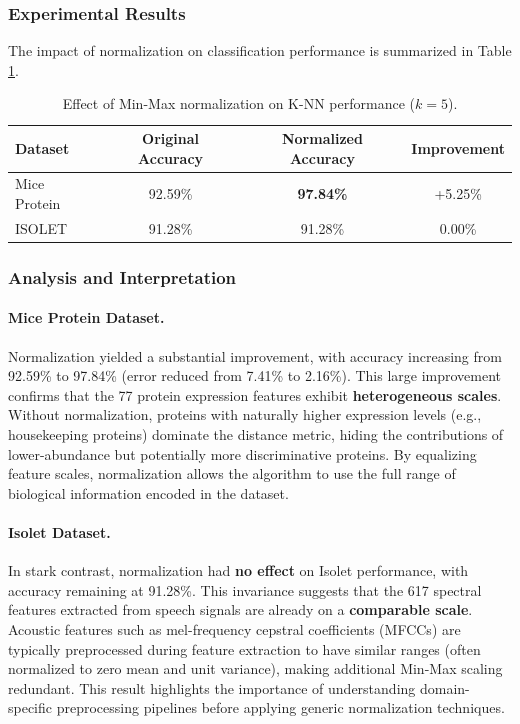 \documentclass[12pt]{article}
\begin{document}
\subsubsection{Experimental Results}
The impact of normalization on classification performance is summarized in Table \ref{tab:norm}.

\begin{table}[H]
\centering
\begin{tabular}{lccc}
\toprule
\textbf{Dataset} & \textbf{Original Accuracy} & \textbf{Normalized Accuracy} & \textbf{Improvement} \\
\midrule
Mice Protein & 92.59\% & \textbf{97.84\%} & +5.25\% \\
ISOLET & 91.28\% & 91.28\% & 0.00\% \\
\bottomrule
\end{tabular}
\caption{Effect of Min-Max normalization on K-NN performance ($k=5$).}
\label{tab:norm}
\end{table}

\subsubsection{Analysis and Interpretation}

\paragraph{Mice Protein Dataset.} Normalization yielded a substantial improvement, with accuracy increasing from 92.59\% to 97.84\% (error reduced from 7.41\% to 2.16\%). This large improvement confirms that the 77 protein expression features exhibit \textbf{heterogeneous scales}. Without normalization, proteins with naturally higher expression levels (e.g., housekeeping proteins) dominate the distance metric, hiding the contributions of lower-abundance but potentially more discriminative proteins. By equalizing feature scales, normalization allows the algorithm to use the full range of biological information encoded in the dataset.

\paragraph{Isolet Dataset.} In stark contrast, normalization had \textbf{no effect} on Isolet performance, with accuracy remaining at 91.28\%. This invariance suggests that the 617 spectral features extracted from speech signals are already on a \textbf{comparable scale}. Acoustic features such as mel-frequency cepstral coefficients (MFCCs) are typically preprocessed during feature extraction to have similar ranges (often normalized to zero mean and unit variance), making additional Min-Max scaling redundant. This result highlights the importance of understanding domain-specific preprocessing pipelines before applying generic normalization techniques.
\end{document}
